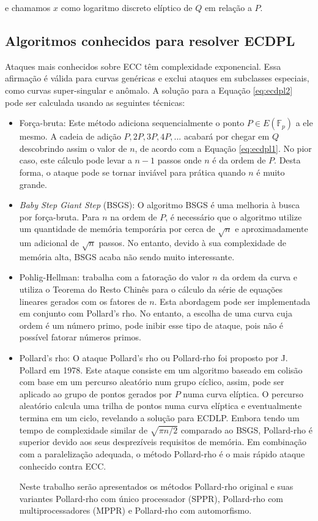 e chamamos \(x\) como logaritmo discreto elíptico de \(Q\) em relação a \(P\). \cite{Hoffstein:2008}

%
%
\subsection{Algoritmos conhecidos para resolver ECDPL}
Ataques mais conhecidos sobre ECC têm complexidade exponencial. Essa afirmação é válida para curvas genéricas e exclui ataques em subclasses especiais, como curvas super-singular e anômalo. A solução para a Equação \ref{eq:ecdpl2} pode ser calculada usando as seguintes técnicas: \cite{Pelzl:2006}

\begin{itemize}
\item Força-bruta: Este método adiciona sequencialmente o ponto $P \in E(\mathbb{F}_p)$ a ele mesmo. A cadeia de adição $P, 2P, 3P, 4P, ...$ acabará por chegar em \(Q\) descobrindo assim o valor de \(n\), de acordo com a Equação \ref{eq:ecdpl1}. No pior caso, este cálculo pode levar a $n - 1$ passos onde \(n\) é da ordem de \(P\). Desta forma, o ataque pode se tornar inviável para prática quando \(n\) é muito grande.
\item \textit{Baby Step Giant Step} (BSGS): O algoritmo BSGS é uma melhoria à busca por força-bruta. Para \(n\) na ordem de \(P\), é necessário que o algoritmo utilize um quantidade de memória temporária por cerca de $\sqrt{n}$ e aproximadamente um adicional de $\sqrt{n}$ passos. No entanto, devido à sua complexidade de memória alta, BSGS acaba não sendo muito interessante.
\item Pohlig-Hellman: trabalha com a fatoração do valor \(n\) da ordem da curva e utiliza o Teorema do Resto Chinês para o cálculo da série de equações lineares gerados com os fatores de \(n\). Esta abordagem pode ser implementada em conjunto com Pollard's rho. No entanto, a escolha de uma curva cuja ordem é um número primo, pode inibir esse tipo de ataque, pois não é possível fatorar números primos.
\item Pollard's rho: O ataque Pollard's rho ou Pollard-rho foi proposto por J. Pollard em 1978. Este ataque consiste em um algoritmo baseado em colisão com base em um percurso aleatório num grupo cíclico, assim, pode ser aplicado ao grupo de pontos gerados por \(P\) numa curva elíptica. O percurso aleatório calcula uma trilha de pontos numa curva elíptica e eventualmente termina em um ciclo, revelando a solução para ECDLP. \cite{Pollard:1978} Embora tendo um tempo de complexidade similar de $\sqrt{\pi n/2}$ comparado ao BSGS, Pollard-rho é superior devido aos seus desprezíveis requisitos de memória. Em combinação com a paralelização adequada, o método Pollard-rho é o mais rápido ataque conhecido contra ECC. \cite{Pelzl:2006}

Neste trabalho serão apresentados os métodos Pollard-rho original e suas variantes Pollard-rho com único processador (SPPR), Pollard-rho com multiprocessadores (MPPR) e Pollard-rho com automorfismo.
\end{itemize}

